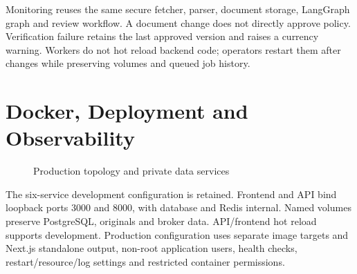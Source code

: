 \documentclass[12pt,a4paper,twoside]{report}
\begin{document}
Monitoring reuses the same secure fetcher, parser, document storage, LangGraph graph and review workflow. A document change does not directly approve policy. Verification failure retains the last approved version and raises a currency warning. Workers do not hot reload backend code; operators restart them after changes while preserving volumes and queued job history.

\section{Docker, Deployment and Observability}

\begin{figure}[htbp]\centering
{}

\caption{Production topology and private data services}\label{fig:4-5}\end{figure}

The six-service development configuration is retained. Frontend and API bind loopback ports 3000 and 8000, with database and Redis internal. Named volumes preserve PostgreSQL, originals and broker data. API/frontend hot reload supports development. Production configuration uses separate image targets and Next.js standalone output, non-root application users, health checks, restart/resource/log settings and restricted container permissions.
\end{document}
